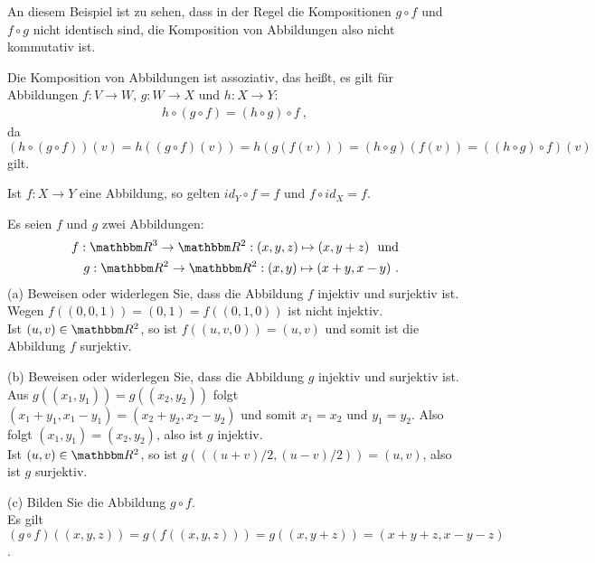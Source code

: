 \begin{Unit}[Anmerkung] 
An diesem Beispiel ist zu sehen, dass in der Regel die Kompositionen 
$g \circ f$ und $f \circ g$ nicht identisch sind, die Komposition von 
Abbildungen also nicht kommutativ ist.

Die Komposition von Abbildungen ist assoziativ, das heißt, es gilt für 
Abbildungen $f : V \rightarrow W$, $g : W \rightarrow X$ und 
$h: X \rightarrow Y$:
\begin{align}
  h \circ (g \circ f) = (h \circ g) \circ f \ ,
\end{align}
da $(h \circ (g \circ f))(v) = h((g \circ f)(v)) = h(g(f(v))) = 
(h \circ g)(f(v)) = ((h \circ g) \circ f)(v)$ gilt.

Ist $f: X \rightarrow Y$ eine Abbildung, so gelten $id_Y \circ f = f$ und 
$f \circ id_X = f$.
\end{Unit} 

\begin{Unit}[Beispiel] 
  Es seien $f$ und $g$ zwei Abbildungen:
  \begin{align}
    f:\RR^3 \rightarrow \RR^2: (x,y,z) \mapsto (x,y+z)\ \text{ und} \\
    g:\RR^2 \rightarrow \RR^2: (x,y) \mapsto (x+y,x-y) \ .
  \end{align}
  (a) Beweisen oder widerlegen Sie, dass die Abbildung $f$ injektiv und
    surjektiv ist. \\
  Wegen $f((0,0,1)) = (0,1) = f((0,1,0))$ ist nicht injektiv. \\
  Ist $(u,v) \in \RR^2$, so ist $f((u,v,0)) = (u,v)$ und somit ist die 
    Abbildung $f$ surjektiv.

  (b) Beweisen oder widerlegen Sie, dass die Abbildung $g$ injektiv und
    surjektiv ist. \\
  Aus $g((x_1,y_1)) = g((x_2,y_2))$ folgt $(x_1+y_1,x_1-y_1) = 
    (x_2+y_2,x_2-y_2)$ und somit $x_1 = x_2$ und $y_1 = y_2$. Also folgt 
    $(x_1,y_1) = (x_2,y_2)$, also ist $g$ injektiv.\\
  Ist $(u,v) \in \RR^2$, so ist $g(((u+v)/2,(u-v)/2)) = (u,v)$, also ist $g$
    surjektiv.

  (c) Bilden Sie die Abbildung $g \circ f$.\\
  Es gilt $(g \circ f)((x,y,z)) = g(f((x,y,z))) = g((x,y+z)) 
  = (x+y+z,x-y-z)$.

\end{Unit}

